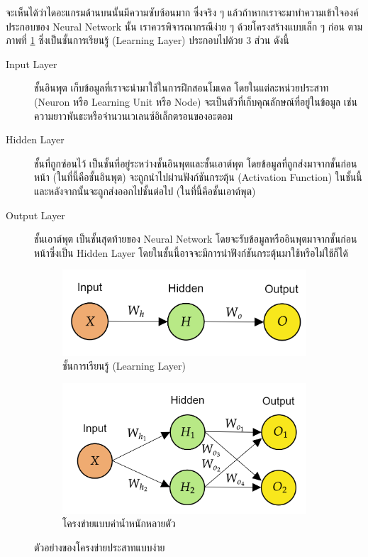 จะเห็นได้ว่าไดอะแกรมด้านบนนั้นมีความซับซ้อนมาก ซึ่งจริง ๆ แล้วถ้าหากเราจะมาทำความเข้าใจองค์ประกอบของ Neural Network นั้น เราควรพิจารณากรณีง่าย ๆ ด้วยโครงสร้างแบบเล็ก ๆ ก่อน ตามภาพที่ \ref{fig:nn_layer} ซึ่งเป็นชั้นการเรียนรู้ (Learning Layer) ประกอบไปด้วย 3 ส่วน ดังนี้

\begin{description}
    \item[Input Layer] ชั้นอินพุต เก็บข้อมูลที่เราจะนำมาใช้ในการฝึกสอนโมเดล โดยในแต่ละหน่วยประสาท (Neuron หรือ Learning Unit หรือ Node) จะเป็นตัวที่เก็บคุณลักษณ์ที่อยู่ในข้อมูล เช่น ความยาวพันธะหรือจำนวนเวเลนซ์อิเล็กตรอนของอะตอม

    \item[Hidden Layer] ชั้นที่ถูกซ่อนไว้ เป็นชั้นที่อยู่ระหว่างชั้นอินพุตและชั้นเอาต์พุต โดยข้อมูลที่ถูกส่งมาจากชั้นก่อนหน้า (ในที่นี้คือชั้นอินพุต) จะถูกนำไปผ่านฟังก์ชันกระตุ้น (Activation Function) ในชั้นนี้ และหลังจากนั้นจะถูกส่งออกไปชั้นต่อไป (ในที่นี้คือชั้นเอาต์พุต)

    \item[Output Layer] ชั้นเอาต์พุต เป็นชั้นสุดท้ายของ Neural Network โดยจะรับข้อมูลหรืออินพุตมาจากชั้นก่อนหน้าซึ่งเป็น Hidden Layer โดยในชั้นนี้อาจจะมีการนำฟังก์ชันกระตุ้นมาใช้หรือไม่ใช้ก็ได้
\end{description}

\begin{figure}[H]
    \centering
    \begin{subfigure}{0.5\textwidth}
        \centering
        \includegraphics[width=0.9\linewidth]{fig/nn_layer.png}
        \caption{ชั้นการเรียนรู้ (Learning Layer)}
        \label{fig:nn_layer}
    \end{subfigure}%
    \begin{subfigure}{0.5\textwidth}
        \centering
        \includegraphics[width=0.9\linewidth]{fig/nn_w_matrices.png}
        \caption{โครงข่ายแบบค่าน้ำหนักหลายตัว}
        \label{fig:nn_w_matrices}
    \end{subfigure}
    \caption{ตัวอย่างของโครงข่ายประสาทแบบง่าย}
    \label{fig:nn_layer_w}
\end{figure}

